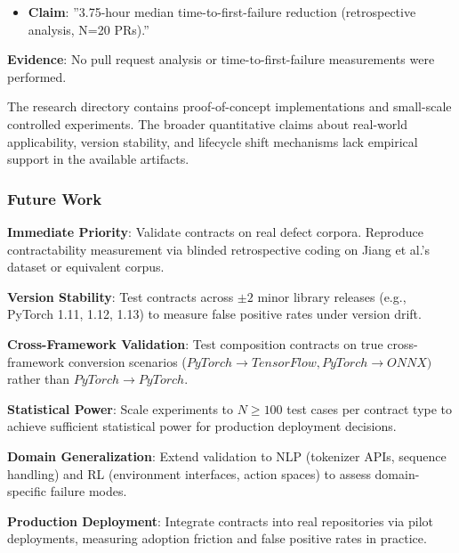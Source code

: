 \begin{itemize}
\item \textbf{Claim}: ''3.75-hour median time-to-first-failure reduction (retrospective analysis, N=20 PRs).''
\end{itemize}
  \textbf{Evidence}: No pull request analysis or time-to-first-failure measurements were performed.

The research directory contains proof-of-concept implementations and small-scale controlled experiments. The broader quantitative claims about real-world applicability, version stability, and lifecycle shift mechanisms lack empirical support in the available artifacts.

\subsubsection{Future Work}

\textbf{Immediate Priority}: Validate contracts on real defect corpora. Reproduce contractability measurement via blinded retrospective coding on Jiang et al.'s dataset or equivalent corpus.

\textbf{Version Stability}: Test contracts across $\pm 2$ minor library releases (e.g., PyTorch 1.11, 1.12, 1.13) to measure false positive rates under version drift.

\textbf{Cross-Framework Validation}: Test composition contracts on true cross-framework conversion scenarios ($PyTorch\rightarrow TensorFlow, PyTorch\rightarrow ONNX)$ rather than $PyTorch\rightarrow PyTorch$.

\textbf{Statistical Power}: Scale experiments to $N\geq 100$ test cases per contract type to achieve sufficient statistical power for production deployment decisions.

\textbf{Domain Generalization}: Extend validation to NLP (tokenizer APIs, sequence handling) and RL (environment interfaces, action spaces) to assess domain-specific failure modes.

\textbf{Production Deployment}: Integrate contracts into real repositories via pilot deployments, measuring adoption friction and false positive rates in practice.
